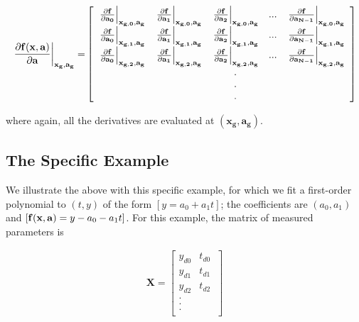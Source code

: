 \documentclass[psfig,preprint]{aastex}
\begin{document}
\begin{eqnarray}
\mathbf{ \left.{ \partial f(x, a) \over \partial a}\right|_{x_g, a_g}  = }
\left[
\begin{array}{ccccc}
 \mathbf{ \left.  \partial f \over \partial a_0 \right|_{x_{g,0},a_g} } &
 \mathbf{ \left.  \partial f \over \partial a_1 \right|_{x_{g,0},a_g} } &
 \mathbf{ \left.  \partial f \over \partial a_2 \right|_{x_{g,0},a_g} } &
... & 
 \mathbf{ \left.  \partial f \over \partial a_{N-1} \right|_{x_{g,0},a_g} } \\
 \mathbf{ \left.  \partial f \over \partial a_0 \right|_{x_{g,1},a_g} } &
 \mathbf{ \left.  \partial f \over \partial a_1 \right|_{x_{g,1},a_g} } &
 \mathbf{ \left.  \partial f \over \partial a_2 \right|_{x_{g,1},a_g} } &
... & 
 \mathbf{ \left.  \partial f \over \partial a_{N-1} \right|_{x_{g,1},a_g} } \\
 \mathbf{ \left.  \partial f \over \partial a_0 \right|_{x_{g,2},a_g} } &
 \mathbf{ \left.  \partial f \over \partial a_1 \right|_{x_{g,2},a_g} } &
 \mathbf{ \left.  \partial f \over \partial a_2 \right|_{x_{g,2},a_g} } &
... & 
 \mathbf{ \left.  \partial f \over \partial a_{N-1} \right|_{x_{g,2},a_g} } \\
  &  &  . & & \\
  &  &  . & & \\
  &  &  . & & \\
\end{array}
\right]
\end{eqnarray}

\noindent where again, all the derivatives are evaluated at $(\mathbf{ x_g,
a_g})$. 

\subsection{The Specific Example} \label{example}

We illustrate the above with this specific example, for which we fit a
first-order polynomial to $(t,y)$ of the form $[y = a_0 + a_1 t]$; the
coefficients are $(a_0, a_1)$ and $[{\bf f(x,a)}= y - a_0 - a_1t]$.  For this
example, the matrix of measured parameters is

\begin{eqnarray}
\mathbf {X} = \left[
\begin{array}{cc}
y_{d0} & t_{d0} \\
y_{d1} & t_{d1} \\
y_{d2} & t_{d2} \\
. & \\
. & \\
. & \\
\end{array}
\ \right]
\end{eqnarray}
\end{document}
